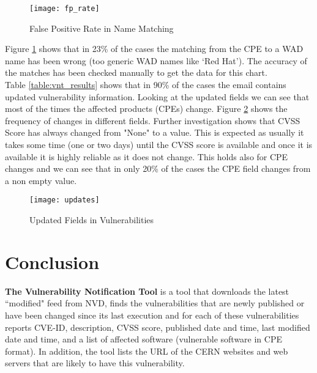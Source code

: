 \begin{figure}[h!]
\label{figure:fp_rate}
  \centering
    \texttt{[image: fp\_rate]}
  \caption{False Positive Rate in Name Matching}
\end{figure}


Figure \ref{figure:fp_rate} shows that in 23\% of the cases the matching from the CPE to a WAD name has been wrong (too generic WAD names like `Red Hat'). The accuracy of the matches has been checked manually to get the data for this chart.
\\
Table \ref{table:vnt_results} shows that in 90\%  of the cases the email contains updated vulnerability information. Looking at the updated fields we can see that most of the times the affected products (CPEs) change. Figure \ref{figure:updates} shows the frequency of changes in different fields. Further investigation shows that CVSS Score has always changed from "None" to a value. This is expected as usually it takes some time (one or two days) until the CVSS score is available and once it is available it is highly reliable as it does not change. This holds also for CPE changes and we can see that in only 20\% of the cases the CPE field changes from a non empty value.




\begin{figure}[h!]
\label{figure:updates}
  \centering
    \texttt{[image: updates]}
  \caption{Updated Fields in Vulnerabilities}
\end{figure}

\section{Conclusion}
\begin{framed}
\textbf{The Vulnerability Notification Tool} is a tool that downloads the latest ``modified" feed from NVD, finds the vulnerabilities that are newly published or have been changed since its last execution and for each of these vulnerabilities reports CVE-ID, description, CVSS score, published date and time, last modified date and time, and a list of affected software (vulnerable software in CPE format). In addition, the tool lists the URL of the CERN websites and web servers that are likely to have this vulnerability.
\end{framed} 















